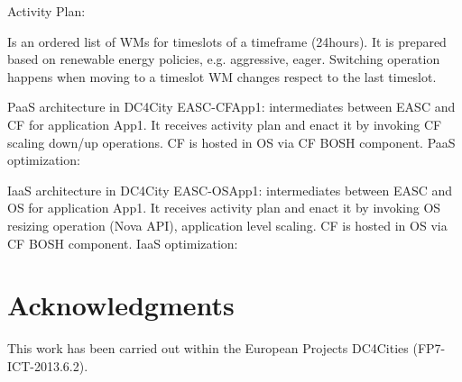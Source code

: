 \documentclass[10pt, conference, compsocconf]{IEEEtran}
\begin{document}
Activity Plan:

Is an ordered list of WMs for timeslots of a timeframe (24hours).
It is prepared based on renewable energy policies, e.g. aggressive, eager.
Switching operation happens when moving to a timeslot WM changes respect to the last timeslot.

PaaS architecture in DC4City
EASC-CFApp1: intermediates between EASC and CF for application App1. It receives activity plan and enact it by invoking CF scaling down/up operations.
CF is hosted in OS via CF BOSH component.
PaaS optimization:

IaaS architecture in DC4City
EASC-OSApp1: intermediates between EASC and OS for application App1. It receives activity plan and enact it by invoking OS resizing operation (Nova API), application level scaling.
CF is hosted in OS via CF BOSH component.
IaaS optimization:





\section*{Acknowledgments}

This work has been carried out within the European Projects DC4Cities (FP7-ICT-2013.6.2).



\end{document}

